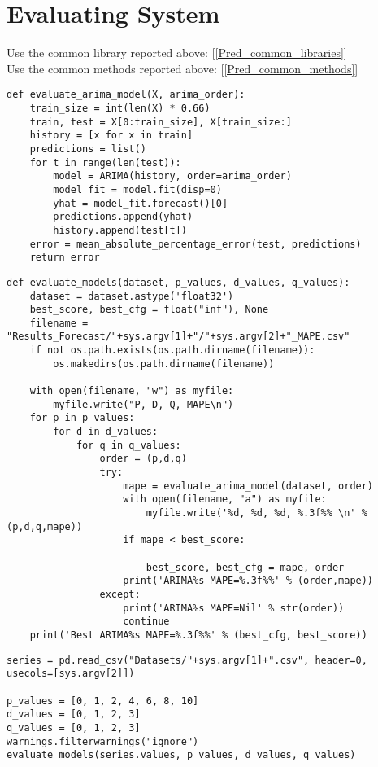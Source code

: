 \section{Evaluating System}
\label{Evaluating_System}
Use the common library reported above: [\ref{Pred_common_libraries}] \\
Use the common methods reported above: [\ref{Pred_common_methods}] \\
\begin{lstlisting}
def evaluate_arima_model(X, arima_order):
	train_size = int(len(X) * 0.66)
	train, test = X[0:train_size], X[train_size:]
	history = [x for x in train]
	predictions = list()
	for t in range(len(test)):
		model = ARIMA(history, order=arima_order)
		model_fit = model.fit(disp=0)
		yhat = model_fit.forecast()[0]
		predictions.append(yhat)
		history.append(test[t])
	error = mean_absolute_percentage_error(test, predictions)
	return error
\end{lstlisting}
\begin{lstlisting}
def evaluate_models(dataset, p_values, d_values, q_values):
	dataset = dataset.astype('float32')
	best_score, best_cfg = float("inf"), None
	filename = "Results_Forecast/"+sys.argv[1]+"/"+sys.argv[2]+"_MAPE.csv"
	if not os.path.exists(os.path.dirname(filename)):	
		os.makedirs(os.path.dirname(filename))

	with open(filename, "w") as myfile:
		myfile.write("P, D, Q, MAPE\n")
	for p in p_values:
		for d in d_values:
			for q in q_values:
				order = (p,d,q)
				try:
					mape = evaluate_arima_model(dataset, order)
					with open(filename, "a") as myfile:
						myfile.write('%d, %d, %d, %.3f%% \n' % (p,d,q,mape))
					if mape < best_score:

						best_score, best_cfg = mape, order
					print('ARIMA%s MAPE=%.3f%%' % (order,mape))
				except:
					print('ARIMA%s MAPE=Nil' % str(order))
					continue
	print('Best ARIMA%s MAPE=%.3f%%' % (best_cfg, best_score))
\end{lstlisting}
\begin{lstlisting}
series = pd.read_csv("Datasets/"+sys.argv[1]+".csv", header=0, usecols=[sys.argv[2]])

p_values = [0, 1, 2, 4, 6, 8, 10]
d_values = [0, 1, 2, 3]
q_values = [0, 1, 2, 3]
warnings.filterwarnings("ignore")
evaluate_models(series.values, p_values, d_values, q_values)
\end{lstlisting}

\newpage

